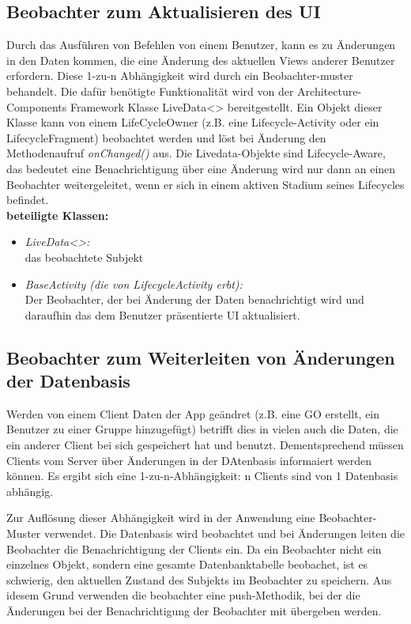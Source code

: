 \subsection{Beobachter zum Aktualisieren des UI}
Durch das Ausführen von Befehlen von einem Benutzer, kann es zu Änderungen in den Daten kommen, die eine Änderung des aktuellen Views anderer Benutzer erfordern. Diese 1-zu-n Abhängigkeit wird durch ein Beobachter-muster behandelt. Die dafür benötigte Funktionalität wird von der Architecture-Components Framework Klasse LiveData<> bereitgestellt. Ein Objekt dieser Klasse kann von einem LifeCycleOwner (z.B. eine Lifecycle-Activity oder ein LifecycleFragment) beobachtet werden und löst bei Änderung den Methodenaufruf \textit{onChanged()} aus. Die Livedata-Objekte sind Lifecycle-Aware, das bedeutet eine Benachrichtigung über eine Änderung wird nur dann an einen Beobachter weitergeleitet, wenn er sich in einem aktiven Stadium seines Lifecycles befindet.\\
\textbf{beteiligte Klassen:}
\begin{itemize}
	\item \textit{LiveData<>:}\\ das beobachtete Subjekt
	\item \textit{BaseActivity (die von LifecycleActivity erbt):}\\ Der Beobachter, der bei Änderung der Daten benachrichtigt wird und daraufhin das dem Benutzer präsentierte UI aktualisiert.
\end{itemize}

\subsection{Beobachter zum Weiterleiten von Änderungen der Datenbasis}
Werden von einem Client Daten der App geändret (z.B. eine GO erstellt, ein Benutzer zu einer Gruppe hinzugefügt) betrifft dies in vielen auch die Daten, die ein anderer Client bei sich gespeichert hat und benutzt. Dementsprechend müssen Clients vom Server über Änderungen in der DAtenbasis informaiert werden können. Es ergibt sich eine 1-zu-n-Abhängigkeit: n Clients sind von 1 Datenbasis abhängig.

Zur Auflösung dieser Abhängigkeit wird in der Anwendung eine Beobachter-Muster verwendet. Die Datenbasis wird beobachtet und bei Änderungen leiten die Beobachter die Benachrichtigung der Clients
ein. Da ein Beobachter nicht ein einzelnes Objekt, sondern eine gesamte Datenbanktabelle beobachet, ist es schwierig, den aktuellen Zustand des Subjekts im Beobachter zu speichern. Aus idesem Grund verwenden die beobachter eine push-Methodik, bei der die Änderungen bei der Benachrichtigung der Beobachter mit übergeben werden.

